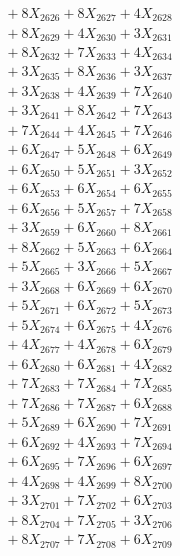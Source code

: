 \documentclass[a4paper,10pt]{article}
\begin{document}
{\begin{align}
&\;  + 8 X_{2626} + 8 X_{2627} + 4 X_{2628} \\[0.3ex]
&\;  + 8 X_{2629} + 4 X_{2630} + 3 X_{2631} \\[0.3ex]
&\;  + 8 X_{2632} + 7 X_{2633} + 4 X_{2634} \\[0.3ex]
&\;  + 3 X_{2635} + 8 X_{2636} + 3 X_{2637} \\[0.3ex]
&\;  + 3 X_{2638} + 4 X_{2639} + 7 X_{2640} \\[0.3ex]
&\;  + 3 X_{2641} + 8 X_{2642} + 7 X_{2643} \\[0.3ex]
&\;  + 7 X_{2644} + 4 X_{2645} + 7 X_{2646} \\[0.3ex]
&\;  + 6 X_{2647} + 5 X_{2648} + 6 X_{2649} \\[0.5ex]\allowbreak
&\;  + 6 X_{2650} + 5 X_{2651} + 3 X_{2652} \\[0.3ex]
&\;  + 6 X_{2653} + 6 X_{2654} + 6 X_{2655} \\[0.3ex]
&\;  + 6 X_{2656} + 5 X_{2657} + 7 X_{2658} \\[0.3ex]
&\;  + 3 X_{2659} + 6 X_{2660} + 8 X_{2661} \\[0.3ex]
&\;  + 8 X_{2662} + 5 X_{2663} + 6 X_{2664} \\[0.3ex]
&\;  + 5 X_{2665} + 3 X_{2666} + 5 X_{2667} \\[0.3ex]
&\;  + 3 X_{2668} + 6 X_{2669} + 6 X_{2670} \\[0.3ex]
&\;  + 5 X_{2671} + 6 X_{2672} + 5 X_{2673} \\[0.3ex]
&\;  + 5 X_{2674} + 6 X_{2675} + 4 X_{2676} \\[0.3ex]
&\;  + 4 X_{2677} + 4 X_{2678} + 6 X_{2679} \\[0.5ex]\allowbreak
&\;  + 6 X_{2680} + 6 X_{2681} + 4 X_{2682} \\[0.3ex]
&\;  + 7 X_{2683} + 7 X_{2684} + 7 X_{2685} \\[0.3ex]
&\;  + 7 X_{2686} + 7 X_{2687} + 6 X_{2688} \\[0.3ex]
&\;  + 5 X_{2689} + 6 X_{2690} + 7 X_{2691} \\[0.3ex]
&\;  + 6 X_{2692} + 4 X_{2693} + 7 X_{2694} \\[0.3ex]
&\;  + 6 X_{2695} + 7 X_{2696} + 6 X_{2697} \\[0.3ex]
&\;  + 4 X_{2698} + 4 X_{2699} + 8 X_{2700} \\[0.3ex]
&\;  + 3 X_{2701} + 7 X_{2702} + 6 X_{2703} \\[0.3ex]
&\;  + 8 X_{2704} + 7 X_{2705} + 3 X_{2706} \\[0.3ex]
&\;  + 8 X_{2707} + 7 X_{2708} + 6 X_{2709} \\[0.5ex]\allowbreak

\end{align}}
\end{document}
